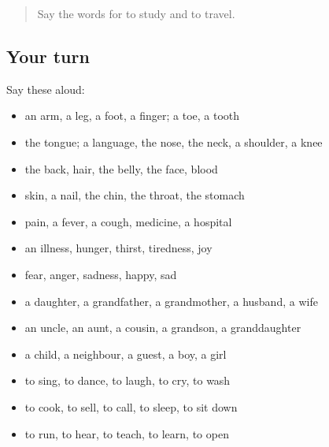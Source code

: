 \begin{quote}
Say the words for to study and to travel.
\end{quote}

\subsection*{Your turn}
Say these aloud:

\begin{itemize}
\raggedright
  \item an arm, a leg, a foot, a finger; a toe, a tooth
  \item the tongue; a language, the nose, the neck, a shoulder, a knee
  \item the back, hair, the belly, the face, blood
  \item skin, a nail, the chin, the throat, the stomach
  \item pain, a fever, a cough, medicine, a hospital
  \item an illness, hunger, thirst, tiredness, joy
  \item fear, anger, sadness, happy, sad
  \item a daughter, a grandfather, a grandmother, a husband, a wife
  \item an uncle, an aunt, a cousin, a grandson, a granddaughter
  \item a child, a neighbour, a guest, a boy, a girl
  \item to sing, to dance, to laugh, to cry, to wash
  \item to cook, to sell, to call, to sleep, to sit down
  \item to run, to hear, to teach, to learn, to open
\end{itemize}


